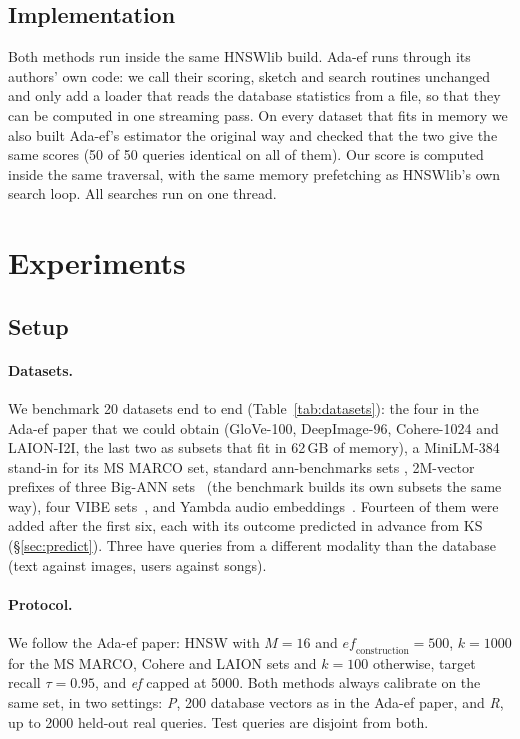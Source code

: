 \documentclass[sigconf,review=false,screen]{acmart}
\newcommand{\ef}{\textit{ef}}
\begin{document}
\subsection{Implementation}

Both methods run inside the same HNSWlib build. Ada-ef runs through its authors' own code: we call
their scoring, sketch and search routines unchanged and only add a loader that reads the database
statistics from a file, so that they can be computed in one streaming pass. On every dataset that
fits in memory we also built Ada-ef's estimator the original way and checked that the two give the
same scores (50 of 50 queries identical on all of them). Our score is computed inside the same
traversal, with the same memory prefetching as HNSWlib's own search loop. All searches run on one
thread.

\section{Experiments}

\subsection{Setup}

\paragraph{Datasets.}
We benchmark 20 datasets end to end (Table~\ref{tab:datasets}): the four in the Ada-ef paper that
we could obtain (GloVe-100, DeepImage-96, Cohere-1024 and LAION-I2I, the last two as subsets that
fit in 62\,GB of memory), a MiniLM-384 stand-in for its MS MARCO set, standard ann-benchmarks sets
\cite{aumuller2020annbenchmarks}, 2M-vector prefixes of three Big-ANN sets~\cite{simhadri2022bigann}
(the benchmark builds its own subsets the same way), four VIBE sets~\cite{jaasaari2025vibe}, and
Yambda audio embeddings~\cite{ploshkin2025yambda}. Fourteen of them were added after the first six,
each with its outcome predicted in advance from KS (\S\ref{sec:predict}). Three have queries from a
different modality than the database (text against images, users against songs).

\paragraph{Protocol.}
We follow the Ada-ef paper: HNSW with $M = 16$ and $\mathit{ef}_{\mathrm{construction}} = 500$,
$k = 1000$ for the MS MARCO, Cohere and LAION sets and $k = 100$ otherwise, target recall
$\tau = 0.95$, and \ef{} capped at 5000. Both methods always calibrate on the same set, in two
settings: \emph{P}, 200 database vectors as in the Ada-ef paper, and \emph{R}, up to 2000 held-out
real queries. Test queries are disjoint from both.
\end{document}
